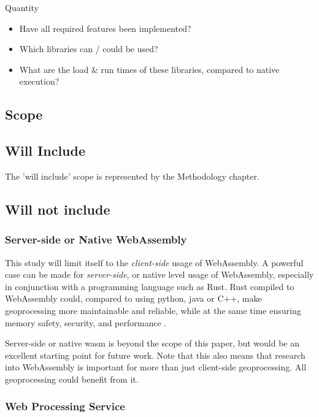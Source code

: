 Quantity
\begin{itemize}
    \item Have all required features been implemented?
    \item Which libraries can / could be used?
    \item What are the load \& run times of these libraries, compared to native execution?
\end{itemize} 

\newpage
\subsection{Scope}
\subsection*{Will Include}

The 'will include' scope is represented by the Methodology chapter. 


\subsection*{Will not include}

\subsubsection*{Server-side or Native WebAssembly} %

This study will limit itself to the \emph{client-side} usage of WebAssembly. 
A powerful case can be made for \emph{server-side}, or native level usage of WebAssembly, especially in conjunction with a programming language such as Rust. 
Rust compiled to WebAssembly could, compared to using python, java or C++, make geoprocessing more maintainable and reliable, while at the same time ensuring memory safety, security, and performance \cite{clack_standardizing_2019}. 

Server-side or native wasm is beyond the scope of this paper, but would be an excellent starting point for future work. Note that this also means that research into WebAssembly is important for more than just client-side geoprocessing. All geoprocessing could benefit from it.



\subsubsection*{Web Processing Service} %


